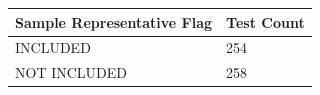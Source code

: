 \begin{table}[h!]
\centering
\begin{tabular}{ll}
\hline
\textbf{Sample Representative Flag} & \textbf{Test Count} \\ 
\hline
INCLUDED & 254 \\ 
NOT INCLUDED & 258 \\ 
\hline
\end{tabular}
\end{table}